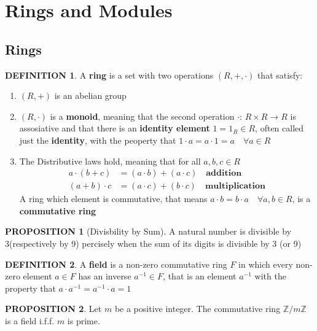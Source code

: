 \documentclass[12pt]{article}
\theoremstyle{definition}
\newtheorem{definition}{DEFINITION}[subsection]
\newtheorem{prop}{PROPOSITION}[subsection]
\begin{document}
\section{Rings and Modules}
\subsection{Rings}
\begin{definition}
    A \textbf{ring} is a set with two operations $(R,+,\cdot)$ that satisfy:
    \begin{enumerate}
        \item $(R,+)$ is an abelian group
        \item $(R,\cdot)$ is a \textbf{monoid}, meaning that the second operation $\cdot$: $R\times R\rightarrow R$ is assosiative and that there is an \textbf{identity element} $1 = 1_R \in R$, often called just the \textbf{identity}, with the peoperty that $1\cdot a = a \cdot 1 = a \quad\forall a \in R$
        \item The Distributive laws hold, meaning that for all $a,b,c \in R$ \[\begin{split}
            a\cdot (b+c) &= (a\cdot b)+(a \cdot c)\quad \textbf{addition}\\
            (a+b) \cdot c &= (a \cdot c) + (b \cdot c) \quad \textbf{multiplication}
        \end{split}\]
    A ring which element is commutative, that means $a \cdot b = b \cdot a \quad \forall a,b \in R$, is a \textbf{commutative ring}
    \end{enumerate}
\end{definition}

\begin{prop}[Divisbility by Sum]
    A natural number is divisible by 3(respectively by 9) percisely when the sum of its digits is divisible by 3 (or 9)
\end{prop}

\begin{definition}
    A \textbf{field} is a non-zero commutative ring $F$ in which every non-zero element $a\in F$ has an inverse $a^{-1} \in F$, that is an element $a^{-1}$ with the property that $a\cdot a^{-1} = a^{-1}\cdot a = 1$
\end{definition}

\begin{prop}
    Let $m$ be a positive integer. The commutative ring $\mathbb{Z}/m\mathbb{Z}$ is a field i.f.f. $m$ is prime.
\end{prop}
\end{document}
